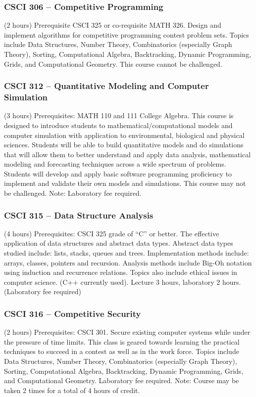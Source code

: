 \subsubsection{CSCI 306 -- Competitive Programming}
(2 hours) Prerequisite CSCI 325 or co-requisite MATH 326. Design and implement algorithms for competitive programming contest problem sets.  Topics include Data Structures, Number Theory, Combinatorics (especially Graph Theory), Sorting, Computational Algebra, Backtracking, Dynamic Programming, Grids, and Computational Geometry. This course cannot be challenged.

\subsubsection{CSCI 312 -- Quantitative Modeling and Computer Simulation}
(3 hours) Prerequisites: MATH 110 and 111 College Algebra. This course is designed to introduce students to mathematical/computational models and computer simulation with application to environmental, biological and physical sciences.  Students will be able to build quantitative models and do simulations that will allow them to better understand and apply data analysis, mathematical modeling and forecasting techniques across a wide spectrum of problems.  Students will develop and apply basic software programming proficiency to implement and validate their own models and simulations.   This course may not be challenged. Note: Laboratory fee required.

\subsubsection{CSCI 315 -- Data Structure Analysis}
(4 hours) Prerequisites: CSCI 325 grade of “C” or better. The effective application of data structures and abstract data types. Abstract data types studied include: lists, stacks, queues and trees. Implementation methods include: arrays, classes, pointers and recursion. Analysis methods include Big-Oh notation using induction and recurrence relations. Topics also include ethical issues in computer science. (C++ currently used). Lecture 3 hours, laboratory 2 hours. (Laboratory fee required)

\subsubsection{CSCI 316 -- Competitive Security}
(2 hours) Prerequisites: CSCI 301. Secure existing computer systems while under the pressure of time limits.  This class is geared towards learning the practical techniques to succeed in a contest as well as in the work force.   Topics include Data Structures, Number Theory, Combinatorics (especially Graph Theory), Sorting, Computational Algebra, Backtracking, Dynamic Programming, Grids, and Computational Geometry. Laboratory fee required. Note: Course may be taken 2 times for a total of 4 hours of credit.

